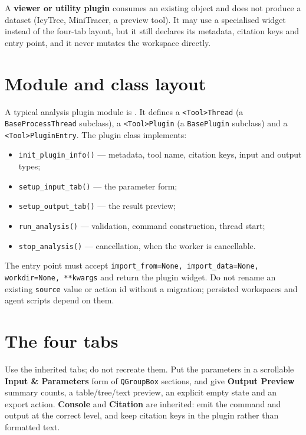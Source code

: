 \documentclass[10pt]{report}
\begin{document}
A \textbf{viewer or utility plugin} consumes an existing object and does not
produce a dataset (IcyTree, MiniTracer, a preview tool). It may use a
specialised widget instead of the four-tab layout, but it still declares its
metadata, citation keys and entry point, and it never mutates the workspace
directly.

\section{Module and class layout}

A typical analysis plugin module is
. It defines a
\texttt{<Tool>Thread} (a \texttt{BaseProcessThread} subclass), a
\texttt{<Tool>Plugin} (a \texttt{BasePlugin} subclass) and a
\texttt{<Tool>PluginEntry}. The plugin class implements:

\begin{itemize}
  \item \texttt{init\_plugin\_info()} --- metadata, tool name, citation keys,
        input and output types;
  \item \texttt{setup\_input\_tab()} --- the parameter form;
  \item \texttt{setup\_output\_tab()} --- the result preview;
  \item \texttt{run\_analysis()} --- validation, command construction, thread
        start;
  \item \texttt{stop\_analysis()} --- cancellation, when the worker is
        cancellable.
\end{itemize}

The entry point must accept
\texttt{import\_from=None, import\_data=None, workdir=None, **kwargs} and
return the plugin widget. Do not rename an existing \texttt{source} value or
action id without a migration; persisted workspaces and agent scripts depend on
them.

\section{The four tabs}

Use the inherited tabs; do not recreate them. Put the parameters in a
scrollable \textbf{Input \& Parameters} form of \texttt{QGroupBox} sections,
and give \textbf{Output Preview} summary counts, a table/tree/text preview, an
explicit empty state and an export action. \textbf{Console} and
\textbf{Citation} are inherited: emit the command and output at the correct
level, and keep citation keys in the plugin rather than formatted text.
\end{document}
